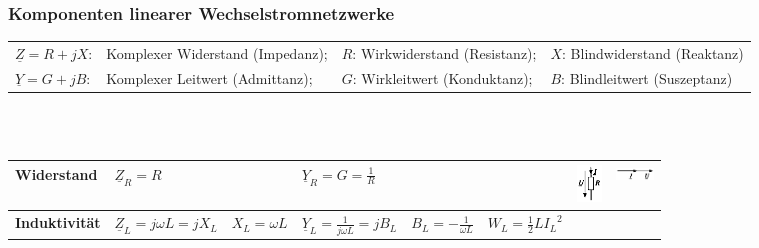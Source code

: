 		\subsubsection{Komponenten linearer Wechselstromnetzwerke}%
			\begin{tabular}{llll}
			$\underline{Z} = R +j X$: 
				& Komplexer Widerstand (Impedanz); 
				& $R$: Wirkwiderstand (Resistanz); 
				& $X$: Blindwiderstand (Reaktanz)\\
			$\underline{Y} = G + j B$: 
				& Komplexer Leitwert (Admittanz); 
				& $G$: Wirkleitwert (Konduktanz); 
				& $B$: Blindleitwert (Suszeptanz)
	      	\end{tabular} \\ \\
			\begin{tabular}{|l|l|l|l|l|l|ll|}
			\hline
				\textbf{Widerstand} & 
					\multicolumn{2}{l|}{$ \underline{Z}_R = R$} & \multicolumn{2}{l|}{$ \underline{Y}_R = G =\frac{1}{R}$} &
					&
					\parbox[c][0.8cm][c]{1cm}{\includegraphics[height=1cm,angle=90]{bilder/Wirkwiderstand.png}}&
                	\parbox[c][0.8cm][c]{1cm}{\includegraphics[width=1cm]{bilder/WirkwiderstandZeiger.png}} \\
			\hline	                    
				\textbf{Induktivit\"at} &
					$ \underline{Z}_L = j \omega L = j X_L$&
					$ X_L = \omega L$ &
					$ \underline{Y}_L = \frac{1}{j \omega L} = j B_L$ & 
					$ B_L = - \frac{1}{\omega L}$ &
					$ W_L=\frac12 L {I_L}^2$  &
					

\end{tabular}
